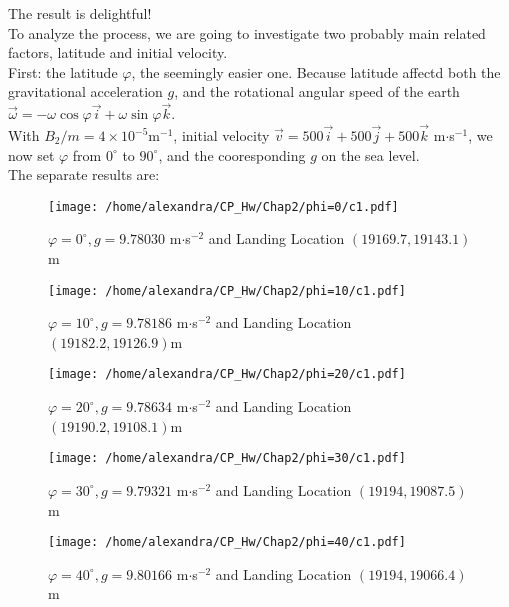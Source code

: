 \documentclass[a4paper]{article}
\begin{document}
\noindent The result is delightful!\\
To analyze the process, we are going to investigate two probably main related factors, latitude and initial velocity. \\
First: the latitude $\varphi$, the seemingly easier one. Because latitude affectd both the gravitational acceleration $g$, and the rotational angular speed of the earth $\vec{\omega}=-\omega\cos\varphi\vec{i}+\omega\sin\varphi\vec{k}$.\\
With $B_2/m=4\times10^{-5}$m$^{-1}$, initial velocity $\vec{v}=500\vec{i}+500\vec{j}+500\vec{k}$ m$\cdot$s$^{-1}$, we now set $\varphi$ from $0^\circ$ to $90^\circ$, and the cooresponding $g$ on the sea level.\\
The separate results are:\\
\begin{figure}[htbp]
\centering
\texttt{[image: /home/alexandra/CP\_Hw/Chap2/phi=0/c1.pdf]}
\caption{$\varphi=0^\circ,g=9.78030$ m$\cdot$s$^{-2}$ and Landing Location $(19169.7,19143.1)$m}
\end{figure}

\begin{figure}[htbp]
\centering
\texttt{[image: /home/alexandra/CP\_Hw/Chap2/phi=10/c1.pdf]}
\caption{$\varphi=10^\circ,g=9.78186$ m$\cdot$s$^{-2}$ and Landing Location $(19182.2,19126.9)$m}
\end{figure}

\begin{figure}[htbp]
\centering
\texttt{[image: /home/alexandra/CP\_Hw/Chap2/phi=20/c1.pdf]}
\caption{$\varphi=20^\circ,g=9.78634$ m$\cdot$s$^{-2}$ and Landing Location $(19190.2,19108.1)$m}
\end{figure}

\begin{figure}[htbp]
\centering
\texttt{[image: /home/alexandra/CP\_Hw/Chap2/phi=30/c1.pdf]}
\caption{$\varphi=30^\circ,g=9.79321$ m$\cdot$s$^{-2}$ and Landing Location $(19194,19087.5)$m}
\end{figure}

\begin{figure}[htbp]
\centering
\texttt{[image: /home/alexandra/CP\_Hw/Chap2/phi=40/c1.pdf]}
\caption{$\varphi=40^\circ,g=9.80166$ m$\cdot$s$^{-2}$ and Landing Location $(19194,19066.4)$m}
\end{figure}
\end{document}
